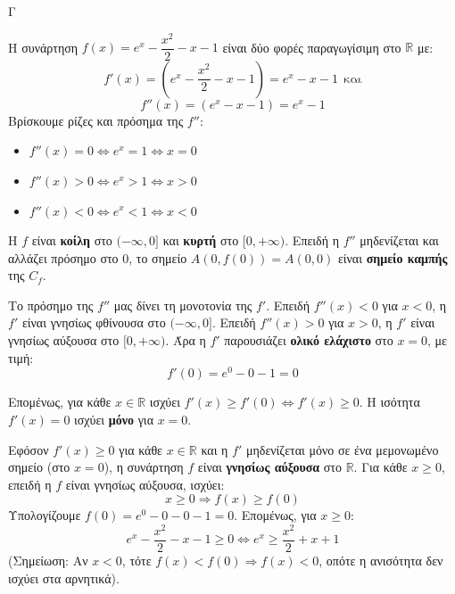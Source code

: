 \begin{thema}{Γ}
\begin{erwthma}
\item Η συνάρτηση $f(x)=e^x-\dfrac{x^2}{2}-x-1$ είναι δύο φορές παραγωγίσιμη στο $\mathbb{R}$ με:
\[f'(x)=\left(e^x-\dfrac{x^2}{2}-x-1\right)=e^x-x-1\ \ \text{και}\]
\[f''(x)=\left(e^x-x-1\right)=e^x-1\]
Βρίσκουμε ρίζες και πρόσημα της $f''$:
\begin{itemize}
\item $f''(x)=0\Leftrightarrow e^x=1\Leftrightarrow x=0$
\item $f''(x)>0\Leftrightarrow e^x>1\Leftrightarrow x>0$
\item $f''(x)<0\Leftrightarrow e^x<1\Leftrightarrow x<0$
\end{itemize}
\begin{center}
\end{center}
Η $f$ είναι \textbf{κοίλη} στο $(-\infty,0]$ και \textbf{κυρτή} στο $[0,+\infty)$. Επειδή η $f''$ μηδενίζεται και αλλάζει πρόσημο στο $0$, το σημείο $A(0,f(0))=A(0,0)$ είναι \textbf{σημείο καμπής} της $C_f$.

\item Το πρόσημο της $f''$ μας δίνει τη μονοτονία της $f'$. Επειδή $f''(x)<0$ για $x<0$, η $f'$ είναι γνησίως φθίνουσα στο $(-\infty,0]$. Επειδή $f''(x)>0$ για $x>0$, η $f'$ είναι γνησίως αύξουσα στο $[0,+\infty)$.
Άρα η $f'$ παρουσιάζει \textbf{ολικό ελάχιστο} στο $x=0$, με τιμή:
\[f'(0)=e^0-0-1=0\]
\begin{center}
\end{center}
Επομένως, για κάθε $x\in\mathbb{R}$ ισχύει $f'(x)\geq f'(0)\Leftrightarrow f'(x)\geq 0$. Η ισότητα $f'(x)=0$ ισχύει \textbf{μόνο} για $x=0$.

\item Εφόσον $f'(x)\geq 0$ για κάθε $x\in\mathbb{R}$ και η $f'$ μηδενίζεται μόνο σε ένα μεμονωμένο σημείο (στο $x=0$), η συνάρτηση $f$ είναι \textbf{γνησίως αύξουσα} στο $\mathbb{R}$.
Για κάθε $x\geq 0$, επειδή η $f$ είναι γνησίως αύξουσα, ισχύει:
\[x\geq 0 \Rightarrow f(x)\geq f(0)\]
Υπολογίζουμε $f(0)=e^0-0-0-1=0$. Επομένως, για $x\geq 0$:
\[e^x-\frac{x^2}{2}-x-1\geq 0 \Leftrightarrow e^x\geq \frac{x^2}{2}+x+1\]
(Σημείωση: Αν $x<0$, τότε $f(x)<f(0)\Rightarrow f(x)<0$, οπότε η ανισότητα δεν ισχύει στα αρνητικά).


\end{erwthma}
\end{thema}
